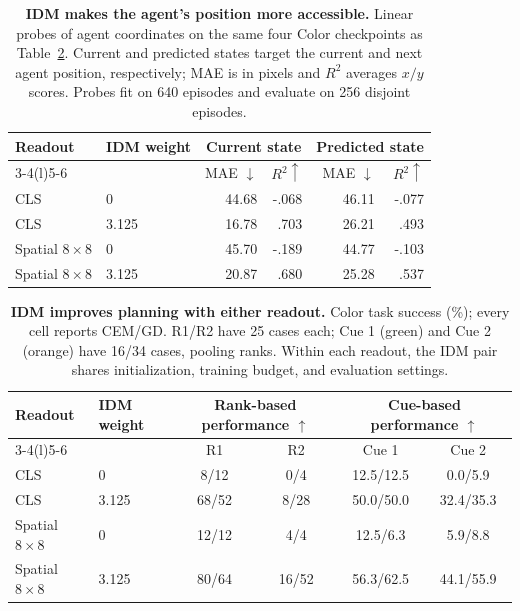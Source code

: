 \begin{table}[!htbp]
\centering
\caption{\textbf{IDM makes the agent's position more accessible.}
Linear probes of agent coordinates on the same four Color checkpoints as
Table~\ref{tab:idmplanning}. Current and predicted states target the current
and next agent position, respectively; MAE is in pixels and $R^2$ averages
$x/y$ scores. Probes fit on 640 episodes and evaluate on 256 disjoint episodes.}
\label{tab:agentidm}
\renewcommand{\arraystretch}{1.12}
\begin{tabular*}{\linewidth}{@{\extracolsep{\fill}}llrrrr@{}}
\toprule
Readout & IDM weight & \multicolumn{2}{c}{Current state} & \multicolumn{2}{c}{Predicted state} \\
\cmidrule(lr){3-4}\cmidrule(l){5-6}
 & & MAE $\downarrow$ & $R^2\uparrow$ & MAE $\downarrow$ & $R^2\uparrow$ \\
\midrule
CLS & 0 & 44.68 & -.068 & 46.11 & -.077 \\
CLS & 3.125 & 16.78 & .703 & 26.21 & .493 \\
Spatial $8\times8$ & 0 & 45.70 & -.189 & 44.77 & -.103 \\
Spatial $8\times8$ & 3.125 & 20.87 & .680 & 25.28 & .537 \\
\bottomrule
\end{tabular*}
\end{table}

\begin{table}[!htbp]
\centering
\caption{\textbf{IDM improves planning with either readout.}
Color task success (\%); every cell reports CEM/GD. R1/R2 have 25 cases
each; Cue 1 (green) and Cue 2 (orange) have 16/34 cases, pooling ranks.
Within each readout, the IDM pair shares initialization, training budget,
and evaluation settings.}
\label{tab:idmplanning}
\renewcommand{\arraystretch}{1.12}
\setlength{\tabcolsep}{3pt}
\begin{tabular*}{\linewidth}{@{\extracolsep{\fill}}llcccc@{}}
\toprule
Readout & IDM weight & \multicolumn{2}{c}{Rank-based performance $\uparrow$} & \multicolumn{2}{c}{Cue-based performance $\uparrow$} \\
\cmidrule(lr){3-4}\cmidrule(l){5-6}
 & & R1 & R2 & Cue 1 & Cue 2 \\
\midrule
CLS & 0 & 8/12 & 0/4 & 12.5/12.5 & 0.0/5.9 \\
CLS & 3.125 & 68/52 & 8/28 & 50.0/50.0 & 32.4/35.3 \\
Spatial $8\times8$ & 0 & 12/12 & 4/4 & 12.5/6.3 & 5.9/8.8 \\
Spatial $8\times8$ & 3.125 & 80/64 & 16/52 & 56.3/62.5 & 44.1/55.9 \\
\bottomrule
\end{tabular*}
\end{table}

